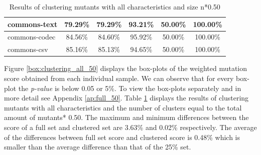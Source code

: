 \documentclass[../../main]{subfiles}
\begin{document}
\begin{table}[!htb]
\begin{tabular}{|l|c|c|c|c|c|}
commons-text                  & 79.29\%                                                                                 & 79.29\%                                                                                     & 93.21\%                                                                              & 50.00\%                                                                               & 100.00\%                                                                             \\ \hline
commons-codec                 & 84.56\%                                                                                 & 84.60\%                                                                                     & 95.92\%                                                                              & 50.00\%                                                                               & 100.00\%                                                                             \\ \hline
commons-csv                   & 85.16\%                                                                                 & 85.13\%                                                                                     & 94.65\%                                                                              & 50.00\%                                                                               & 100.00\%                                                                             \\ \hline
\end{tabular}
\caption{\label{tab:clustering_all_50}Results of clustering mutants with all characteristics and size n*0.50}
\end{table}
\FloatBarrier

Figure \ref{box:clustering_all_50} displays the box-plots of the weighted mutation score obtained from each individual sample. 
We can observe that for every box-plot the \textit{p-value} is below 0.05 or 5\%.
To view the box-plots separately and in more detail see Appendix \ref{ap:full_50}.
Table \ref{tab:clustering_all_50} displays the results of clustering mutants with all characteristics and the number of clusters equal to the total amount of mutants* 0.50.  
The maximum and minimum differences between the score of a full set and clustered set are 3.63\% and 0.02\% respectively.
The average of the differences between full set score and clustered score is 0.48\% which is smaller than the average difference than that of the 25\% set.
\end{document}
